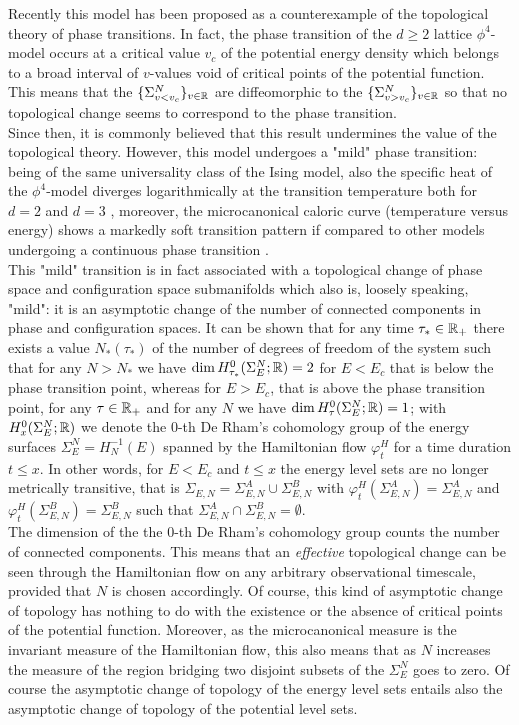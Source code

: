\documentclass[preprintnumbers,showpacs, showkeys, twocolumn,secnumarabic,amssymb,amsmath,amsfonts,aps, pre]{revtex4-1}
\begin{document}
Recently this model has been proposed as a counterexample of the topological theory \cite{KastMehta} of phase transitions. In fact, the phase transition of the $d\ge 2$ lattice $\phi^4$-model occurs at a critical value $v_c$ of the potential energy density which belongs to a broad interval of $v$-values void of critical points of the potential function. This means that the $\{ \Sigma_{v<v_c}^N\}_{v \in{\Bbb R}}$ are diffeomorphic to the  
$\{ \Sigma_{v>v_c}^N\}_{v \in{\Bbb R}}$ so that no topological change seems to correspond to the phase transition.\\
Since then, it is commonly believed that this result undermines the value of the topological theory.
However, this model undergoes a "mild" phase transition: being of the same universality class of the  Ising model, also the specific heat of the $\phi^4$-model diverges logarithmically at the transition temperature both for $d=2$ \cite{huang} and $d=3$ \cite{ising3d}, moreover, the microcanonical caloric curve (temperature versus energy) shows a markedly soft transition pattern \cite{Caiani:1998,CCCPPG} if compared to other models undergoing a continuous phase transition \cite{PettiniBook}. \\
This "mild" transition is in fact associated with a topological change of phase space and configuration space submanifolds which also is, loosely speaking, "mild": it is an asymptotic change of the number of connected components in phase and configuration spaces. It can be shown \cite{goripettini} that for any time $\tau_*\in{\Bbb R_+}$
there exists a value $N_*(\tau_*)$ of the number of degrees of freedom of the system such that for any 
$N > N_*$ 
we have $\dim H_{\tau_*}^0(\Sigma^N_E;{\Bbb R}) = 2$ for $E<E_c$ that is below the phase transition point,
whereas for $E>E_c$, that is above the phase transition point, for any $\tau\in{\Bbb R_+}$ and for any $N$ we have  $\dim H_{\tau}^0(\Sigma^N_E;{\Bbb R}) = 1$; with  $H_{x}^0(\Sigma^N_E;{\Bbb R})$ we denote the $0$-th De Rham's cohomology group of the  energy surfaces $\Sigma^N_E=H_N^{-1}(E)$ spanned by the Hamiltonian flow $\varphi^H_t$ for a time duration $t\le x$. In other words, for $E<E_c$ and $t\le x$ the energy level sets are no longer metrically transitive, that is  $\Sigma_{E,N}=\Sigma^A_{E,N}\cup\Sigma^B_{E,N}$ with $\varphi^H_t(\Sigma^A_{E,N})=\Sigma^A_{E,N}$
and $\varphi^H_t(\Sigma^B_{E,N})=\Sigma^B_{E,N}$ such that  $\Sigma^A_{E,N}\cap\Sigma^B_{E,N}=\emptyset$.\\
 The dimension of the the $0$-th De Rham's cohomology group counts the number of connected components. This means that an \textit{effective} topological change can be seen through the Hamiltonian flow on any arbitrary observational timescale, provided that $N$ is chosen accordingly. Of course, this kind of asymptotic change of topology has nothing to do  with the existence or the absence of critical points of the potential function. Moreover,  as the microcanonical measure is the invariant measure of the Hamiltonian flow, this also means that as $N$ increases the measure of the region bridging two disjoint subsets of the $\Sigma^N_E$ goes to zero. Of course the asymptotic change of topology of the energy level sets entails also the asymptotic change of topology of the potential level sets.\\
\end{document}
